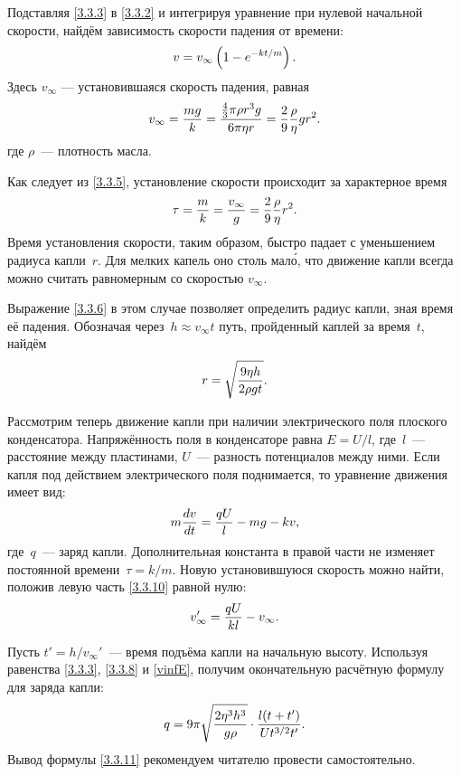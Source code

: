 Подставляя \eqref{3.3.3} в \eqref{3.3.2} и интегрируя уравнение
при нулевой начальной скорости, найдём зависимость скорости падения от времени:
\begin{equation}
	v=v_{\infty}\left(1-e^{-kt/m}\right).
	\eqmark{3.3.5}
\end{equation}
Здесь $v_{\infty}$ --- установившаяся скорость падения, равная
\begin{equation}
	v_{\infty}=\frac{mg}{k}=
    \frac{\frac 43 \pi\rho r^3g }{6\pi\eta r}= \frac29\frac{\rho}{\eta}g r^2.
	\eqmark{3.3.6}
\end{equation}
где $\rho$~--- плотность масла.

Как следует из \eqref{3.3.5}, установление скорости происходит 
за характерное время
\begin{equation}
	\tau=\frac{m}{k}= \frac{v_{\infty}}{g} = \frac 29 \frac{\rho}{\eta}r^2.
	\eqmark{3.3.7}
\end{equation}
Время установления скорости, таким образом, быстро падает с уменьшением радиуса
капли~$r$. Для мелких капель оно столь мал\'{о}, что движение капли всегда можно
считать равномерным со скоростью $v_{\infty}$. 

Выражение \eqref{3.3.6} в этом случае позволяет определить
радиус капли, зная время её падения. Обозначая через~$h\approx v_{\infty}t$ 
путь, пройденный каплей за время~$t$, найдём
\begin{equation}
	r=\sqrt{\frac{9\eta h}{2\rho g t}}.
	\eqmark{3.3.8}
\end{equation}

Рассмотрим теперь движение капли при наличии электрического поля плоского
конденсатора. Напряжённость поля в конденсаторе равна $E=U/l$,
где~$l$~--- расстояние между пластинами, $U$~--- разность потенциалов между
ними. Если капля под действием электрического поля поднимается,
то уравнение движения имеет вид:
\begin{equation}
	m\frac{dv}{dt}=\frac{qU}{l}-mg -kv,
	\eqmark{3.3.10}
\end{equation}
где~$q$~--- заряд капли. Дополнительная константа в правой части не
изменяет постоянной времени~$\tau=k/m$. 
Новую установившуюся скорость можно найти, положив левую часть 
\eqref{3.3.10} равной нулю:
\begin{equation}
\eqmark{vinfE}
v_{\infty}' = \frac{qU}{kl} - v_{\infty}.
\end{equation}

Пусть $t'=h/v_{\infty}'$~--- время подъёма капли на начальную высоту. 
Используя равенства
\eqref{3.3.3}, \eqref{3.3.8} и \eqref{vinfE}, получим 
окончательную расчётную формулу для заряда капли:
\begin{equation}
	q=9\pi\sqrt{\frac{2\eta^3 h^3}{g \rho}}\cdot\frac{l(t+t')}{Ut^{3/2} t'}.
	\eqmark{3.3.11}
\end{equation}
Вывод формулы \eqref{3.3.11} рекомендуем читателю провести самостоятельно.

